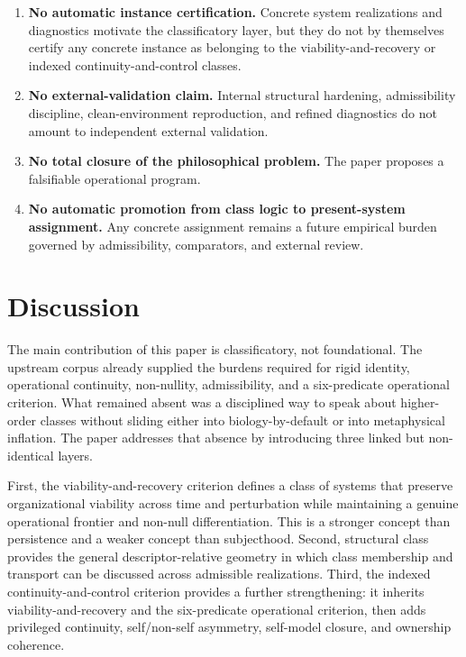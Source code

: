 \documentclass[11pt,a4paper]{article}
\theoremstyle{definition}
\begin{document}
\begin{enumerate}[leftmargin=1.5em]
\item \textbf{No automatic instance certification.} Concrete system realizations and diagnostics motivate the classificatory layer, but they do not by themselves certify any concrete instance as belonging to the viability-and-recovery or indexed continuity-and-control classes.
\item \textbf{No external-validation claim.} Internal structural hardening, admissibility discipline, clean-environment reproduction, and refined diagnostics do not amount to independent external validation.
\item \textbf{No total closure of the philosophical problem.} The paper proposes a falsifiable operational program. 
\item \textbf{No automatic promotion from class logic to present-system assignment.} Any concrete assignment remains a future empirical burden governed by admissibility, comparators, and external review.
\end{enumerate}

\section{Discussion}
The main contribution of this paper is classificatory, not foundational. The upstream corpus already supplied the burdens required for rigid identity, operational continuity, non-nullity, admissibility, and a six-predicate operational criterion. What remained absent was a disciplined way to speak about higher-order classes without sliding either into biology-by-default or into metaphysical inflation. The paper addresses that absence by introducing three linked but non-identical layers.

First, the viability-and-recovery criterion defines a class of systems that preserve organizational viability across time and perturbation while maintaining a genuine operational frontier and non-null differentiation. This is a stronger concept than persistence and a weaker concept than subjecthood. Second, structural class provides the general descriptor-relative geometry in which class membership and transport can be discussed across admissible realizations. Third, the indexed continuity-and-control criterion provides a further strengthening: it inherits viability-and-recovery and the six-predicate operational criterion, then adds privileged continuity, self/non-self asymmetry, self-model closure, and ownership coherence.
\end{document}
